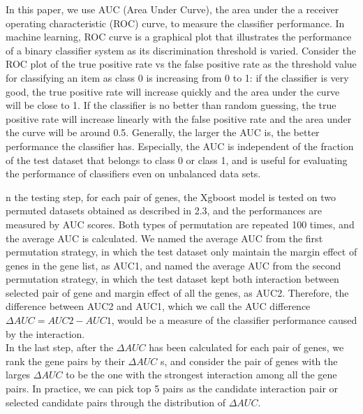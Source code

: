 \documentclass[11pt]{article}
\theoremstyle{plain}
\theoremstyle{definition}
\theoremstyle{remark}
\begin{document}
In this paper, we use AUC (Area Under Curve), the area under the a receiver operating characteristic
(ROC) curve, to measure the classifier performance. In machine learning, ROC curve is a graphical
plot that illustrates the performance of a binary classifier system as its discrimination threshold is
varied. Consider the ROC plot of the true positive rate vs the false positive rate as the threshold
value for classifying an item as class 0 is increasing from 0 to 1: if the classifier is very good, the
true positive rate will increase quickly and the area under the curve will be close to 1. If the classifier
is no better than random guessing, the true positive rate will increase linearly with the false positive
rate and the area under the curve will be around 0.5. Generally, the larger the AUC is, the better
performance the classifier has. Especially, the AUC is independent of the fraction of the test dataset
that belongs to class 0 or class 1, and is useful for evaluating the performance of classifiers even on
unbalanced data sets.

n the testing step, for each pair of genes, the Xgboost model is tested on two permuted datasets
obtained as described in 2.3, and the performances are measured by AUC scores. Both types of
permutation are repeated 100 times, and the average AUC is calculated. We named the average AUC
from the first permutation strategy, in which the test dataset only maintain the margin effect of genes
in the gene list, as AUC1, and named the average AUC from the second permutation strategy, in
which the test dataset kept both interaction between selected pair of gene and margin effect of all
the genes, as AUC2. Therefore, the difference between AUC2 and AUC1, which we call the AUC difference $\Delta AUC=AUC2-AUC1$, would be a measure of the classifier performance caused by the interaction.\\

In the last step, after the $\Delta AUC$ has been calculated for each pair of genes, we rank the gene pairs by their $\Delta AUC$ s, and consider the pair of genes with the larges $\Delta AUC$ to be the one with the
strongest interaction among all the gene pairs. In practice, we can pick top 5 pairs as the candidate interaction pair or selected candidate pairs through the distribution of $\Delta AUC$.
\end{document}
